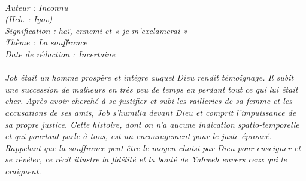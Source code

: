 \BFont
\noindent\hrulefill
{\footnotesize
\textit{
\bigskip
{\centering{}
\\Auteur : Inconnu
\\(Heb. : Iyov)
\\Signification : haï, ennemi et « je m'exclamerai »
\\Thème : La souffrance
\\Date de rédaction : Incertaine\\}
}
\textit{
\\Job était un homme prospère et intègre auquel Dieu rendit témoignage. Il subit une succession de malheurs en très peu de temps en perdant tout ce qui lui était cher. Après avoir cherché à se justifier et subi les railleries de sa femme et les accusations de ses amis, Job s'humilia devant Dieu et comprit l'impuissance de sa propre justice. Cette histoire, dont on n'a aucune indication spatio-temporelle et qui pourtant parle à tous, est un encouragement pour le juste éprouvé.
\\Rappelant que la souffrance peut être le moyen choisi par Dieu pour enseigner et se révéler, ce récit illustre la fidélité et la bonté de Yahweh envers ceux qui le craignent.\bigskip
}
}
\par\nobreak\noindent\hrulefill

